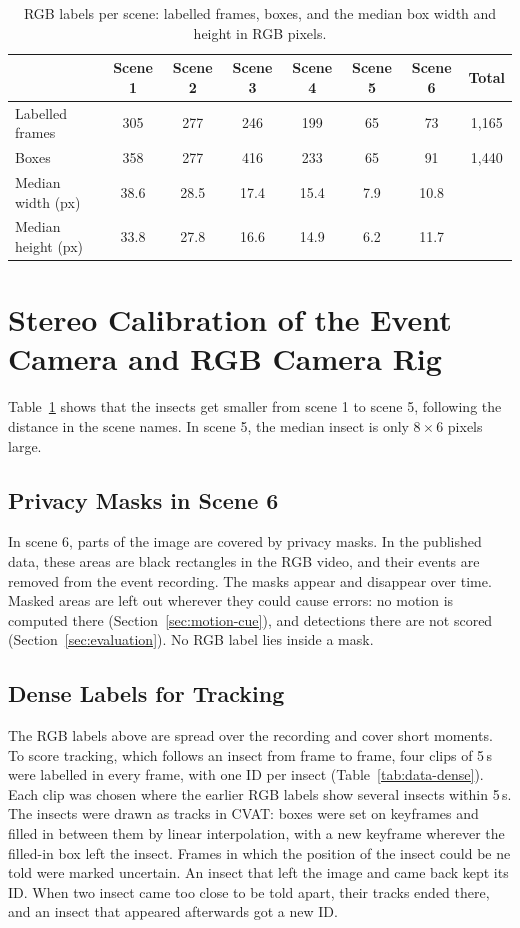 \begin{table}[ht]
    \centering
    \caption{RGB labels per scene: labelled frames, boxes, and the median box
    width and height in RGB pixels.}
    \label{tab:data-rgb-labels}
    \small
    \begin{tabular}{lccccccc}
        \hline
         & Scene 1 & Scene 2 & Scene 3 & Scene 4 & Scene 5 & Scene 6 & Total \\
        \hline
        Labelled frames & 305 & 277 & 246 & 199 & 65 & 73 & 1,165 \\
        Boxes & 358 & 277 & 416 & 233 & 65 & 91 & 1,440 \\
        Median width (px) & 38.6 & 28.5 & 17.4 & 15.4 & 7.9 & 10.8 & \\
        Median height (px) & 33.8 & 27.8 & 16.6 & 14.9 & 6.2 & 11.7 & \\
        \hline
    \end{tabular}
\end{table}
\section{Stereo Calibration of the Event Camera and RGB Camera Rig}

Table~\ref{tab:data-rgb-labels} shows that the insects get smaller from scene 1 to scene 5, 
following the distance in the scene names. In scene 5, the median insect is only $8 \times 
6$ pixels large.

\subsection{Privacy Masks in Scene 6}
\label{sec:data-privacy}

In scene 6, parts of the image are covered by privacy masks. In the published data, these 
areas are black rectangles in the RGB video, and their events are removed from the event
recording. The masks appear and disappear over time. Masked areas are left out wherever 
they could cause errors: no motion is computed there (Section~\ref{sec:motion-cue}), and 
detections there are not scored (Section~\ref{sec:evaluation}). No RGB label lies inside a mask.

\subsection{Dense Labels for Tracking}
\label{sec:data-dense-labels}

The RGB labels above are spread over the recording and cover short moments. To score 
tracking, which follows an insect from frame to frame, four clips of 5\,s were labelled in 
every frame, with one ID per insect (Table~\ref{tab:data-dense}). Each clip was chosen 
where the earlier RGB labels show several insects within 5\,s. The insects were drawn as 
tracks in CVAT: boxes were set on keyframes and filled in between them by linear 
interpolation, with a new keyframe wherever the filled-in box left the insect. Frames in 
which the position of the insect could be ne told were marked uncertain. An insect that left
the image and came back kept its ID. When two insect came too close to be told apart, their
tracks ended there, and an insect that appeared afterwards got a new ID.

